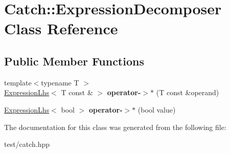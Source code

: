 \hypertarget{classCatch_1_1ExpressionDecomposer}{}\section{Catch\+:\+:Expression\+Decomposer Class Reference}
\label{classCatch_1_1ExpressionDecomposer}
\subsection*{Public Member Functions}
\begin{DoxyCompactItemize}
\item 
{\footnotesize template$<$typename T $>$ }\\\hyperlink{classCatch_1_1ExpressionLhs}{Expression\+Lhs}$<$ T const \& $>$ {\bfseries operator-\/$>$$\ast$} (T const \&operand)\hypertarget{classCatch_1_1ExpressionDecomposer_a22496794d8f55e571ff719516eba4d49}{}\label{classCatch_1_1ExpressionDecomposer_a22496794d8f55e571ff719516eba4d49}

\item 
\hyperlink{classCatch_1_1ExpressionLhs}{Expression\+Lhs}$<$ bool $>$ {\bfseries operator-\/$>$$\ast$} (bool value)\hypertarget{classCatch_1_1ExpressionDecomposer_afd4a9fca08154c361ea2a144a244be18}{}\label{classCatch_1_1ExpressionDecomposer_afd4a9fca08154c361ea2a144a244be18}

\end{DoxyCompactItemize}


The documentation for this class was generated from the following file\+:\begin{DoxyCompactItemize}
\item 
test/catch.\+hpp\end{DoxyCompactItemize}
